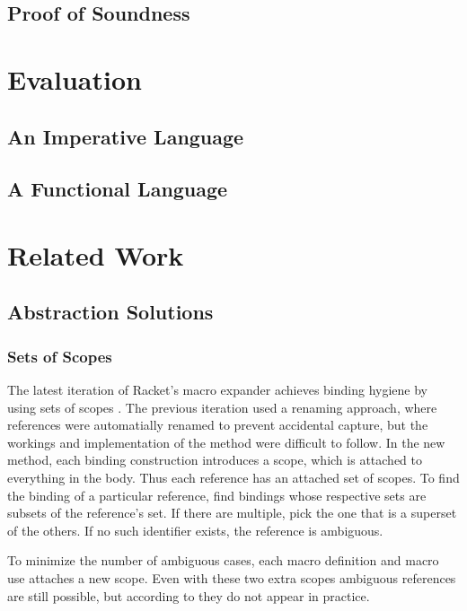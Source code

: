 \documentclass{kththesis}
\begin{document}
\section{Proof of Soundness} \label{sec:proof-no-errors}

\chapter{Evaluation}

\section{An Imperative Language} \label{sec:imperative-eval}

\section{A Functional Language} \label{sec:functional-eval}

\chapter{Related Work}

\section{Abstraction Solutions} \label{sec:abstraction-solutions}

\subsection{Sets of Scopes}

The latest iteration of Racket's \cite{plt-tr1} macro expander achieves binding hygiene by using sets of scopes \cite{Flatt:2016:BSS:2837614.2837620}. The previous iteration used a renaming approach, where references were automatially renamed to prevent accidental capture, but the workings and implementation of the method were difficult to follow. In the new method, each binding construction introduces a scope, which is attached to everything in the body. Thus each reference has an attached set of scopes. To find the binding of a particular reference, find bindings whose respective sets are subsets of the reference's set. If there are multiple, pick the one that is a superset of the others. If no such identifier exists, the reference is ambiguous.

To minimize the number of ambiguous cases, each macro definition and macro use attaches a new scope. Even with these two extra scopes ambiguous references are still possible, but according to \textcite{Flatt:2016:BSS:2837614.2837620} they do not appear in practice.
\end{document}
